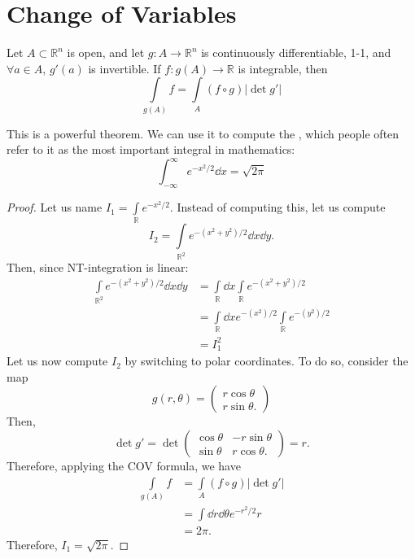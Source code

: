 \documentclass{article}
\numberwithin{equation}{section}
\begin{document}
\section{Change of Variables}
\begin{theorem}
    Let $A\subset \mathbb{R}^n$ is open, and let $g: A\rightarrow \mathbb{R}^n$ is continuously differentiable, 1-1, and $\forall a\in A$, $g'(a)$ is invertible. If $f:g(A) \rightarrow \mathbb{R}$ is integrable, then
    \begin{equation}
        \int\limits_{g(A)} f = \int\limits_{A} (f \circ g) |\det g'|
    \end{equation}
\end{theorem}
This is a powerful theorem. We can use it to compute the , which people often refer to it as the most important integral in mathematics:
\begin{equation}
    \int_{-\infty}^{\infty} e^{-x^2/2} \dd{x} = \sqrt{2\pi}
\end{equation}
\begin{proof}
    Let us name $I_1 = \int\limits_{\mathbb{R}} e^{-x^2/2}.$ Instead of computing this, let us compute 
    \begin{equation}
        I_2 = \int\limits_{\mathbb{R}^2} e^{-(x^2+y^2)/2} \dd{x}\dd{y}.
    \end{equation}
    Then, since NT-integration is linear:
    \begin{align}
        \int\limits_{\mathbb{R}^2} e^{-(x^2+y^2)/2} \dd{x}\dd{y} &= \int\limits_{\mathbb{R}} \dd{x}\int\limits_{\mathbb{R}} e^{-(x^2+y^2)/2} \\ 
        &= \int\limits_{\mathbb{R}} \dd{x} e^{-(x^2)/2} \int\limits_{\mathbb{R}} e^{-(y^2)/2} \\
        &= I_1^2
    \end{align}
    Let us now compute $I_2$ by switching to polar coordinates. To do so, consider the map
    \begin{equation}
        g(r,\theta) = \begin{pmatrix}
            r\cos\theta \\ r\sin\theta.
        \end{pmatrix}
    \end{equation}
    Then,
    \begin{equation}
        \det g' = \det \begin{pmatrix}
            \cos\theta & -r\sin\theta \\ 
            \sin\theta & r\cos\theta.
        \end{pmatrix} = r.
    \end{equation}
    Therefore, applying the COV formula, we have
    \begin{align}
        \int\limits_{g(A)} f &= \int\limits_{A} (f \circ g) |\det g'| \\ 
        &= \int \dd{r}\dd{\theta}e^{-r^2/2} r \\ 
        &= 2\pi.
    \end{align}
    Therefore, $I_1=\sqrt{2\pi}.$
\end{proof}
\end{document}
